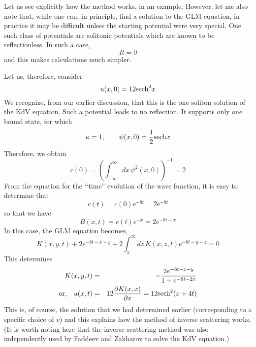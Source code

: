 \documentclass[a4paper,11pt]{article}
\begin{document}
Let us see explicitly how the method works, in an example. However,
let me also note that, while one can, in principle, find a solution to
the GLM equation, in practice it may be difficult unless the starting
potential were very special. One such class of potentials are
solitonic potentials which are known to be reflectionless. In such a
case,
\begin{equation}
R = 0
\end{equation}
and this makes calculations much simpler.

Let us, therefore, consider
\begin{equation}
u (x,0) = 12 {\rm sech}^{2} x
\end{equation}
We recognize, from our earlier discussion, that this is the one
soliton solution of the KdV equation. Such a potential leads to no
reflection. It supports only one bound state, for which
\begin{equation}
\kappa = 1,\qquad \psi (x,0) = {1\over 2} {\rm sech} x
\end{equation}
Therefore, we obtain
\begin{equation}
c(0) = \left(\int_{-\infty}^{\infty} dx\,\psi^{2} (x, 0)\right)^{-1} =
2
\end{equation}
From the equation for the \lq\lq time'' evolution of the wave
function, it is easy to determine that
\begin{equation}
c(t) = c(0) e^{-8t} = 2 e^{-8t}
\end{equation}
so that we have
\begin{equation}
B(x,t) = c(t) e^{-x} = 2 e^{-8t - x}
\end{equation}
In this case, the GLM equation becomes,
\begin{equation}
K(x,y,t) + 2 e^{-8t - x - y} + 2 \int_{x}^{\infty} dz\,K(x,z,t) e^{-8t
-y -z} = 0
\end{equation}
This determines
\begin{eqnarray}
K (x,y,t) & = & - {2e^{-8t - x - y}\over 1 + e^{-8t - 2x}}\nonumber\\
{\rm or,}\quad u (x,t) & = & 12 {\partial K(x,x)\over \partial x} = 12
{\rm sech}^{2} (x + 4t)
\end{eqnarray}
This is, of course, the solution that we had determined earlier
(corresponding to a specific choice of $v$) and this explains how the
method of inverse scattering works. (It is worth noting here that the
inverse scattering method was also independently used by Faddeev and
Zakharov to solve the KdV equation.)
\end{document}
